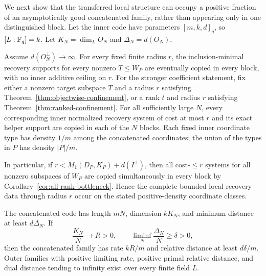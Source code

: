 We next show that the transferred local structure can occupy a positive
fraction of an asymptotically good concatenated family, rather than appearing
only in one distinguished block.  Let the inner code have parameters
$[m,k,d]_q$, so $[L:\mathbb F_q]=k$.  Let $K_N=\dim_L O_N$ and
$\Delta_N=d(O_N)$.

\begin{corollary}
\label{cor:positive-density}
%
Assume $d(O_N^\perp)\to\infty$.  For every fixed finite radius $r$, the
inclusion-minimal recovery supports for every nonzero $T\leq W_P$ are
eventually copied in every block, with no inner additive ceiling on $r$.
For the stronger coefficient statement, fix either a nonzero target subspace $T$ and
a radius $r$ satisfying Theorem~\ref{thm:objectwise-confinement}, or a rank
$t$ and radius $r$ satisfying Theorem~\ref{thm:ranked-confinement}.  For all
sufficiently large $N$, every corresponding inner normalized recovery system
of cost at most $r$ and its exact helper support are copied in each of the
$N$ blocks.  Each fixed inner coordinate
type has density $1/m$ among the concatenated coordinates; the union of the
types in $P$ has density $|P|/m$.

In particular, if $r<M_1(D_P,K_P)+d(I^\perp)$, then all cost-$\leq r$
systems for all nonzero subspaces of $W_P$ are copied simultaneously in every
block by Corollary~\ref{cor:all-rank-bottleneck}.  Hence the complete bounded local recovery data through radius $r$
occur on the stated positive-density coordinate classes.

The concatenated code has length $mN$, dimension $kK_N$, and minimum distance
at least $d\Delta_N$.  If
\[
 \frac{K_N}{N}\longrightarrow R>0,
 \qquad
 \liminf_N\frac{\Delta_N}{N}\geq\delta>0,
\]
then the concatenated family has rate $kR/m$ and relative distance at least
$d\delta/m$.  Outer families with positive limiting rate, positive primal
relative distance, and dual distance tending to infinity exist over every
finite field $L$.
\end{corollary}

